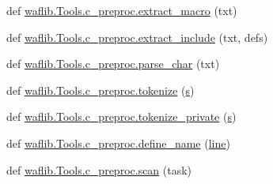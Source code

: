 \begin{DoxyCompactItemize}
\item 
def \hyperlink{namespacewaflib_1_1_tools_1_1c__preproc_ac4048079f0d423f3edbf0b405606a6bd}{waflib.\+Tools.\+c\+\_\+preproc.\+extract\+\_\+macro} (txt)
\item 
def \hyperlink{namespacewaflib_1_1_tools_1_1c__preproc_ad928b7b6148c6578fd74deb15eb15a80}{waflib.\+Tools.\+c\+\_\+preproc.\+extract\+\_\+include} (txt, defs)
\item 
def \hyperlink{namespacewaflib_1_1_tools_1_1c__preproc_a8a6a6b9e71f793a5274f8c637a578e10}{waflib.\+Tools.\+c\+\_\+preproc.\+parse\+\_\+char} (txt)
\item 
def \hyperlink{namespacewaflib_1_1_tools_1_1c__preproc_a782b99400bfe3580d136b0284367a6ca}{waflib.\+Tools.\+c\+\_\+preproc.\+tokenize} (\hyperlink{lib_2expat_8h_a755339d27872b13735c2cab829e47157}{s})
\item 
def \hyperlink{namespacewaflib_1_1_tools_1_1c__preproc_a3a81088bc0021bc85f058d2e9ecd4c00}{waflib.\+Tools.\+c\+\_\+preproc.\+tokenize\+\_\+private} (\hyperlink{lib_2expat_8h_a755339d27872b13735c2cab829e47157}{s})
\item 
def \hyperlink{namespacewaflib_1_1_tools_1_1c__preproc_a5472fea191a92ebf7fd1f2a76ecbb106}{waflib.\+Tools.\+c\+\_\+preproc.\+define\+\_\+name} (\hyperlink{seqread_8c_aad9ebcdde542d8b2075615388ff15a9c}{line})
\item 
def \hyperlink{namespacewaflib_1_1_tools_1_1c__preproc_ae6714bcd14928d773d1b09cb5f1c67bf}{waflib.\+Tools.\+c\+\_\+preproc.\+scan} (task)
\end{DoxyCompactItemize}
